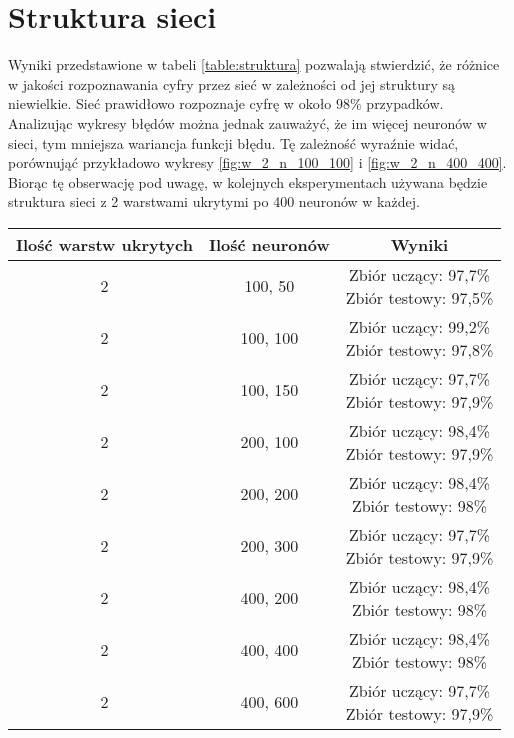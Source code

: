 \section{Struktura sieci}
Wyniki przedstawione w tabeli \ref{table:struktura} pozwalają stwierdzić, że różnice w jakości rozpoznawania cyfry przez sieć w zależności od jej struktury są niewielkie. Sieć prawidłowo rozpoznaje cyfrę w około $98\%$ przypadków. Analizując wykresy błędów można jednak zauważyć, że im więcej neuronów w sieci, tym mniejsza wariancja funkcji błędu. Tę zależność wyraźnie widać, porównująć przykładowo wykresy \ref{fig:w_2_n_100_100} i \ref{fig:w_2_n_400_400}. Biorąc tę obserwację pod uwagę, w kolejnych eksperymentach używana będzie struktura sieci z 2 warstwami ukrytymi po 400 neuronów w każdej.
\begin{table}[h]
\centering
\begin{tabular}{|c|c|c|}
\hline
Ilość warstw ukrytych & Ilość neuronów & Wyniki \\ \hline
2 & 100, 50 & \makecell{Zbiór uczący: 97,7\% \\ Zbiór testowy: 97,5\%} \\ \hline
2 & 100, 100 & \makecell{Zbiór uczący: 99,2\% \\ Zbiór testowy: 97,8\%} \\ \hline
2 & 100, 150 & \makecell{Zbiór uczący: 97,7\% \\ Zbiór testowy: 97,9\%} \\ \hline
2 & 200, 100 & \makecell{Zbiór uczący: 98,4\% \\ Zbiór testowy: 97,9\%} \\ \hline
2 & 200, 200 & \makecell{Zbiór uczący: 98,4\% \\ Zbiór testowy: 98\%} \\ \hline
2 & 200, 300 & \makecell{Zbiór uczący: 97,7\% \\ Zbiór testowy: 97,9\%} \\ \hline
2 & 400, 200 & \makecell{Zbiór uczący: 98,4\% \\ Zbiór testowy: 98\%} \\ \hline
2 & 400, 400 & \makecell{Zbiór uczący: 98,4\% \\ Zbiór testowy: 98\%} \\ \hline
2 & 400, 600 & \makecell{Zbiór uczący: 97,7\% \\ Zbiór testowy: 97,9\%} \\ \hline


\end{tabular}
\end{table}
